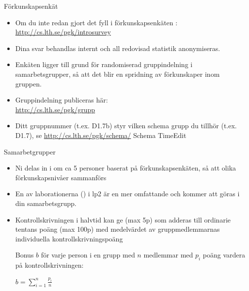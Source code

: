 \begin{Slide}{Förkunskapsenkät}
\begin{itemize}
\item Om du inte redan gjort det fyll i förkunskapsenkäten :
\url{http://cs.lth.se/pgk/introsurvey}
\item Dina svar behandlas internt och all redovisad statistik anonymiseras.
\item Enkäten ligger till grund för randomiserad gruppindelning i samarbetsgrupper, så att det blir en spridning av förkunskaper inom gruppen.
\item Gruppindelning publiceras här: \\ \url{http://cs.lth.se/pgk/grupp}
\item Ditt gruppnummer (t.ex. D1.7b) styr vilken schema grupp du tillhör (t.ex. D1.7), se \url{http://cs.lth.se/pgk/schema/} Schema TimeEdit
\end{itemize}
\end{Slide}

\begin{Slide}{Samarbetgrupper}\footnotesize
\begin{itemize}
\item Ni delas in i  om ca 5 personer baserat på förkunskapsenkäten, så att olika förkunskapsnivåer sammanförs
\item En av laborationerna () i lp2 är en mer omfattande  och kommer att göras i din samarbetsgrupp. \\ \vspace{1em}
\item Kontrollskrivningen i halvtid kan ge  (max 5p) som adderas till ordinarie tentans poäng (max 100p) med medelvärdet av gruppmedlemmarnas individuella kontrollskrivningspoäng
\scriptsize \parbox{7cm}{Bonus $b$ för varje person i en grupp med $n$ medlemmar med $p_i$ poäng vardera på kontrollskrivningen:}
 \hspace{5mm} $\displaystyle b = \sum\limits_{i=1}^n \frac{p_i}{n}$
\end{itemize}
\end{Slide}

\fi

